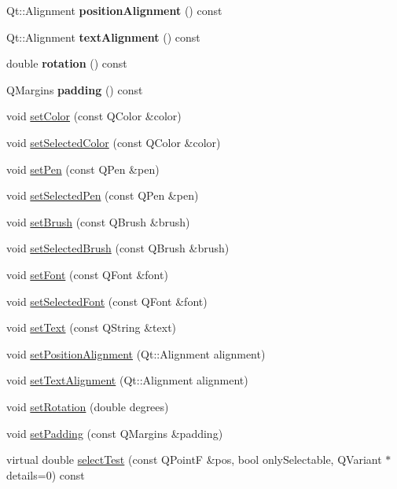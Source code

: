\begin{DoxyCompactItemize}
Qt\+::\+Alignment {\bfseries position\+Alignment} () const
\item 
\mbox{\label{class_q_c_p_item_text_a9af3198d46551e1cc7703f02c95ddfe5}} 
Qt\+::\+Alignment {\bfseries text\+Alignment} () const
\item 
\mbox{\label{class_q_c_p_item_text_a035962b4ed23ff0a89e6a8b46fa18bf1}} 
double {\bfseries rotation} () const
\item 
\mbox{\label{class_q_c_p_item_text_a5a598618350b40446d031fa9dc15fba7}} 
Q\+Margins {\bfseries padding} () const
\item 
void \mbox{\hyperlink{class_q_c_p_item_text_aa51efc0841fe52da9eaf8aff6fc8a8b2}{set\+Color}} (const Q\+Color \&color)
\item 
void \mbox{\hyperlink{class_q_c_p_item_text_ae7ba0bdb75c897b028388e45bfd435fa}{set\+Selected\+Color}} (const Q\+Color \&color)
\item 
void \mbox{\hyperlink{class_q_c_p_item_text_a9b9ec6eea0eb0603977ff84d4c78d0a3}{set\+Pen}} (const Q\+Pen \&pen)
\item 
void \mbox{\hyperlink{class_q_c_p_item_text_a291febe586f0da3f1c392e77bef4aa20}{set\+Selected\+Pen}} (const Q\+Pen \&pen)
\item 
void \mbox{\hyperlink{class_q_c_p_item_text_a1c7e131516df2ed8d941ef31240ded8e}{set\+Brush}} (const Q\+Brush \&brush)
\item 
void \mbox{\hyperlink{class_q_c_p_item_text_a6b8377eeb2af75eb9528422671ac16cb}{set\+Selected\+Brush}} (const Q\+Brush \&brush)
\item 
void \mbox{\hyperlink{class_q_c_p_item_text_a94ad60ebe04f5c07c35e7c2029e96b1f}{set\+Font}} (const Q\+Font \&font)
\item 
void \mbox{\hyperlink{class_q_c_p_item_text_a0be2841772f83663c4db307928b82816}{set\+Selected\+Font}} (const Q\+Font \&font)
\item 
void \mbox{\hyperlink{class_q_c_p_item_text_a3dacdda0ac88f99a05b333b977c48747}{set\+Text}} (const Q\+String \&text)
\item 
void \mbox{\hyperlink{class_q_c_p_item_text_a781cdf8c640fc6a055dcff1e675c8c7a}{set\+Position\+Alignment}} (Qt\+::\+Alignment alignment)
\item 
void \mbox{\hyperlink{class_q_c_p_item_text_ab5bc0684c4d1bed81949a11b34dba478}{set\+Text\+Alignment}} (Qt\+::\+Alignment alignment)
\item 
void \mbox{\hyperlink{class_q_c_p_item_text_a4bcc10cd97952c3f749d75824b5077f0}{set\+Rotation}} (double degrees)
\item 
void \mbox{\hyperlink{class_q_c_p_item_text_aeea8a3e01f135f9dd0bb08f51db66310}{set\+Padding}} (const Q\+Margins \&padding)
\item 
virtual double \mbox{\hyperlink{class_q_c_p_item_text_aca74494fd5e769f331a6eb3e29f32916}{select\+Test}} (const Q\+PointF \&pos, bool only\+Selectable, Q\+Variant $\ast$details=0) const
\end{DoxyCompactItemize}

